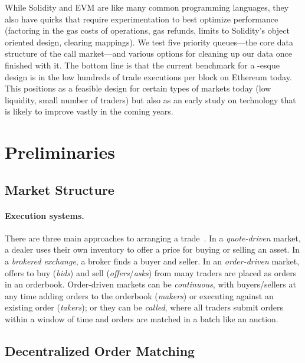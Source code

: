 While Solidity and EVM are like many common programming languages, they also have quirks that require experimentation to best optimize performance (\eg factoring in the gas costs of operations, gas refunds, limits to Solidity's object oriented design, clearing mappings). We test five priority queues---the core data structure of the call market---and various options for cleaning up our data once finished with it. The bottom line is that the current benchmark for a \cm-esque design is in the low hundreds of trade executions per block on Ethereum today. This positions \cm as a feasible design for certain types of markets today (low liquidity, small number of traders) but also as an early study on technology that is likely to improve vastly in the coming years. 


\section{Preliminaries}

\subsection{Market Structure}

\paragraph{Execution systems.} There are three main approaches to arranging a trade~\cite{Har03}. In a \emph{quote-driven} market, a dealer uses their own inventory to offer a price for buying or selling an asset. In a \emph{brokered exchange}, a broker finds a buyer and seller. In an \emph{order-driven} market, offers to buy (\emph{bids}) and sell (\emph{offers}/\emph{asks}) from many traders are placed as orders in an orderbook. Order-driven markets can be \emph{continuous}, with buyers/sellers at any time adding orders to the orderbook (\emph{makers}) or executing against an existing order (\emph{takers}); or they can be \emph{called}, where all traders submit orders within a window of time and orders are matched in a batch like an auction. 

\subsection{Decentralized Order Matching}

